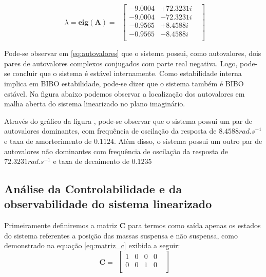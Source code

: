     \begin{equation} \label{eq:autovalores}
        \begin{split}
             \lambda=\mathbf{eig(A)}=\
        \end{split}
        \begin{bmatrix}
            -9.0004& +72.3231i&\\
            -9.0004& -72.3231i&\\
            -0.9565& + 8.4588i&\\
            -0.9565& - 8.4588i&\\
        \end{bmatrix}
    \end{equation}
        
    Pode-se observar em \ref {eq:autovalores} que o sistema possui, como autovalores, dois pares de autovalores complexos conjugados com parte real negativa. Logo, pode-se concluir que o sistema é estável internamente. Como estabilidade interna implica em BIBO estabilidade, pode-se dizer que o sistema também é BIBO estável.
    Na figura abaixo podemos observar a localização dos autovalores em malha aberta do sistema linearizado no plano imaginário.
    
    Através do gráfico da figura , pode-se observar que o sistema possui um par de autovalores dominantes, com frequência de oscilação da resposta de $8.4588 rad.s^{-1}$ e taxa de amortecimento de $0.1124$. Além disso, o sistema possui um outro par de autovalores não dominantes com frequência de oscilação da resposta de $72.3231 rad.s^{-1}$ e taxa de decaimento de $0.1235$
    
    \subsection{Análise da Controlabilidade e da observabilidade do sistema linearizado}
    
    Primeiramente definiremos a matriz $\mathbf{C}$ para termos como saída apenas os estados do sistema referentes a posição das massas suspensa e não suspensa, como demonstrado na equação \ref{eq:matriz_c} exibida a seguir:
     \FloatBarrier
    \begin{equation} \label{eq:matriz_c}
        \begin{split}
             \mathbf{C}=
        \end{split}
        \begin{bmatrix}
            1&0&0&0&\\
            0&0&1&0&\\
        \end{bmatrix}
    \end{equation}
    
